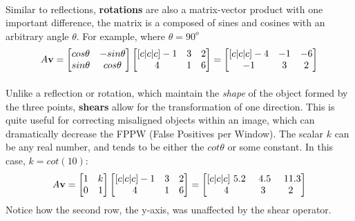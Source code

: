 \documentclass[11pt]{article}
\begin{document}
\paragraph[Rotations]{} Similar to reflections, \textbf{rotations} are also a matrix-vector product with one important difference, the matrix is a composed of sines and cosines with an arbitrary angle $\theta$. For example, where $\theta = 90^{o}$
{\small 
\begin{equation}\label{equ:Rotation}
	\centering
	A\textbf{v}=
	\begin{bmatrix}
	cos\theta & -sin\theta\\
	sin\theta & cos\theta 
	\end{bmatrix}
	\begin{bmatrix}[c|c|c]
	-1 & 3 & 2\\
	4 & 1 & 6
	\end{bmatrix}
	=
	\begin{bmatrix}[c|c|c]
	-4 & -1 & -6\\
	-1 &  3 &  2
	\end{bmatrix}
	\end{equation}
}
\paragraph[Shears]{}Unlike a reflection or rotation, which maintain the \textit{shape} of the object formed by the three points, \textbf{shears} allow for the transformation of one direction. This is quite useful for correcting misaligned objects within an image, which can dramatically decrease the FPPW (False Positives per Window). The scalar $k$ can be any real number, and tends to be either the $cot\theta$ or some constant. In this case, $k=cot(10)$:
{\small 
	\begin{equation}\label{equ:Shears}
	\centering
	A\textbf{v}=
	\begin{bmatrix}
	1 & k\\
	0 & 1 
	\end{bmatrix}
	\begin{bmatrix}[c|c|c]
	-1 & 3 & 2\\
	4 & 1 & 6
	\end{bmatrix}
	=
	\begin{bmatrix}[c|c|c]
	~5.2 & ~4.5 & ~11.3\\
	4 &  3 &  2
	\end{bmatrix}
	\end{equation}
}
Notice how the second row, the y-axis, was unaffected by the shear operator.
\end{document}
